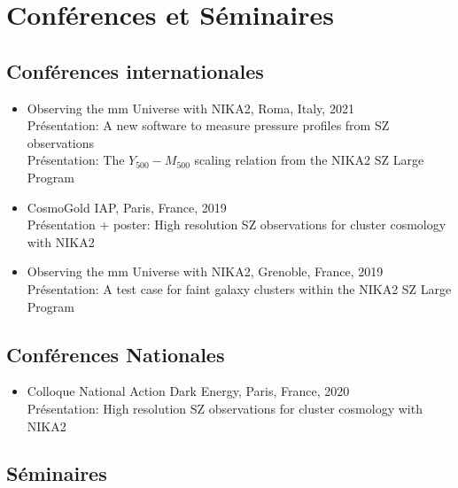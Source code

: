 \vspace{-20pt}
\section{Conférences et Séminaires}\label{talks}

\subsection{Conférences internationales}

\begin{itemize}[leftmargin=20pt]

    \item Observing the mm Universe with NIKA2, Roma, Italy, 2021 \\
        Présentation: A new software to measure pressure profiles from SZ observations \\
        Présentation: The $Y_{500}-M_{500}$ scaling relation from the NIKA2 SZ Large Program

    \item CosmoGold IAP, Paris, France, 2019 \\
        Présentation + poster: High resolution SZ observations for cluster cosmology with NIKA2

    \item Observing the mm Universe with NIKA2, Grenoble, France, 2019 \\
        Présentation: A test case for faint galaxy clusters within the NIKA2 SZ Large Program
\vspace{-5pt}
\end{itemize}

\subsection{Conférences Nationales}

\begin{itemize}[leftmargin=20pt]

    \item Colloque National Action Dark Energy, Paris, France, 2020 \\
        Présentation: High resolution SZ observations for cluster cosmology with NIKA2
\vspace{-5pt}
\end{itemize}

\subsection{Séminaires}

